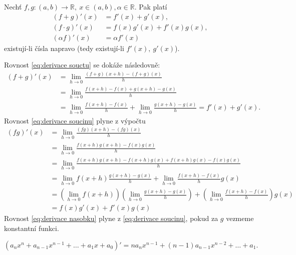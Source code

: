 \begin{věta}
  Nechť $f,g\colon (a,b)\to \mathbb{R},\ x\in (a,b), \alpha\in \mathbb{R}$. Pak platí
  \begin{align}
	  (f+g)'(x) &=f'(x)+g'(x),\label{eq:derivace souctu} \\
	  (f\cdot g)'(x)&=f(x)g'(x)+f'(x)g(x), \label{eq:derivace soucinu} \\
	  (\alpha f)'(x)&=\alpha f'(x) \label{eq:derivace nasobku}
  \end{align}
  existují-li čísla napravo (tedy existují-li $f'(x),\ g'(x)$).
\end{věta}
\begin{důkaz} Rovnost \ref{eq:derivace souctu} se dokáže následovně:
  \begin{align*}
	  (f+g)'(x)&=\lim_{h\to 0}\frac{(f+g)(x+h)-(f+g)(x)}{h}\\
		   &=\lim_{h\to 0}\frac{f(x+h)-f(x)+g(x+h)-g(x)}{h}\\
		   &=\lim_{h\to 0}\frac{f(x+h)-f(x)}{h}+\lim_{h\to 0}\frac{g(x+h)-g(x)}{h}=f'(x)+g'(x).
  \end{align*}
  Rovnost \ref{eq:derivace soucinu} plyne z výpočtu
  \begin{align*}
	  (fg)'(x)&=\lim_{h\to 0}\frac{(fg)(x+h)-(fg)(x)}{h}\\
		  &=\lim_{h\to 0}\frac{f(x+h)g(x+h)-f(x)g(x)}{h}\\
		  &=\lim_{h\to 0}\frac{f(x+h)g(x+h)-f(x+h)g(x)+f(x+h)g(x)-f(x)g(x)}{h}\\
		  &=\lim_{h\to 0}f(x+h)\frac{g(x+h)-g(x)}{h}+\lim_{h\to 0}\frac{f(x+h)-f(x)}{h}g(x)\\
		  &=(\lim_{h\to 0}f(x+h))\left(\lim_{h\to 0}\frac{g(x+h)-g(x)}{h}\right)+\left(\lim_{h\to 0}\frac{f(x+h)-f(x)}{h}\right)g(x)\\
		  &= f(x)g'(x)+f'(x)g(x)
  \end{align*}
  Rovnost \ref{eq:derivace nasobku} plyne z \ref{eq:derivace soucinu}, pokud za $g$ vezmeme konstantní funkci.
\end{důkaz}

\begin{důsledek}
\begin{equation*} 
(a_nx^n+a_{n-1}x^{n-1}+\hdots+a_1x+a_0)'=na_nx^{n-1}+(n-1)a_{n-1}x^{n-2}+\hdots + a_1.
\end{equation*}
\end{důsledek}

